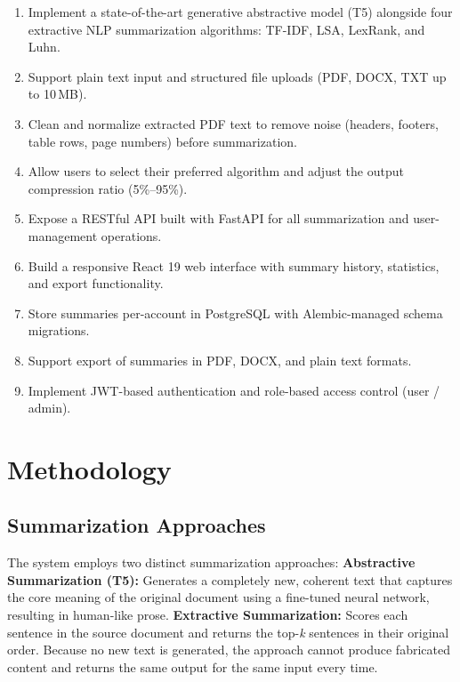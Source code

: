 \documentclass[12pt,a4paper]{article}
\begin{document}
\begin{enumerate}[noitemsep]
  \item Implement a state-of-the-art generative abstractive model (T5) alongside four extractive NLP summarization algorithms: TF-IDF, LSA, LexRank, and Luhn.
  \item Support plain text input and structured file uploads (PDF, DOCX, TXT up to 10\,MB).
  \item Clean and normalize extracted PDF text to remove noise (headers, footers, table rows, page numbers) before summarization.
  \item Allow users to select their preferred algorithm and adjust the output compression ratio (5\%–95\%).
  \item Expose a RESTful API built with FastAPI for all summarization and user-management operations.
  \item Build a responsive React 19 web interface with summary history, statistics, and export functionality.
  \item Store summaries per-account in PostgreSQL with Alembic-managed schema migrations.
  \item Support export of summaries in PDF, DOCX, and plain text formats.
  \item Implement JWT-based authentication and role-based access control (user / admin).
\end{enumerate}

\section{Methodology}

\subsection{Summarization Approaches}

The system employs two distinct summarization approaches:
\textbf{Abstractive Summarization (T5):} Generates a completely new, coherent text that captures the core meaning of the original document using a fine-tuned neural network, resulting in human-like prose.
\textbf{Extractive Summarization:} Scores each sentence in the source document and returns the top-\textit{k} sentences in their original order. Because no new text is generated, the approach cannot produce fabricated content and returns the same output for the same input every time.
\end{document}
